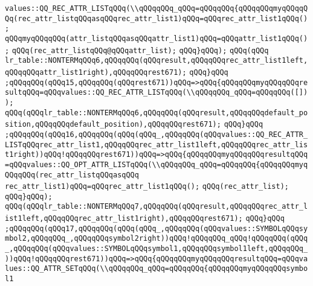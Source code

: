 \verb|values::QQ_REC_ATTR_LISTqQQq(\\qQQqqQQq_qQQq=qQQqqQQq{qQQqqQQqmyqQQqqQQq(rec_attr_listqQQqasqQQqrec_attr_list1)qQQq=qQQqrec_attr_list1qQQq();|\newline
\verb|qQQqmyqQQqqQQq(attr_listqQQqasqQQqattr_list1)qQQq=qQQqattr_list1qQQq();|\newline
\verb|qQQq(rec_attr_listqQQq@qQQqattr_list);|\newline
\verb|qQQq}qQQq);|\newline
\verb|qQQq(qQQq|\newline
\verb|lr_table::NONTERMqQQq6,qQQqqQQq(qQQqresult,qQQqqQQqrec_attr_list1left,qQQqqQQqattr_list1right),qQQqqQQqrest671);|\newline
\verb|qQQq}qQQq|\newline
\verb|;qQQqqQQq(qQQq15,qQQqqQQq(qQQqrest671))qQQq=>qQQq{qQQqqQQqmyqQQqqQQqresultqQQq=qQQqvalues::QQ_REC_ATTR_LISTqQQq(\\qQQqqQQq_qQQq=qQQqqQQq([]));|\newline
\verb|qQQq(qQQqlr_table::NONTERMqQQq6,qQQqqQQq(qQQqresult,qQQqqQQqdefault_position,qQQqqQQqdefault_position),qQQqqQQqrest671);|\newline
\verb|qQQq}qQQq|\newline
\verb|;qQQqqQQq(qQQq16,qQQqqQQq(qQQq(qQQq_,qQQqqQQq(qQQqvalues::QQ_REC_ATTR_LISTqQQqrec_attr_list1,qQQqqQQqrec_attr_list1left,qQQqqQQqrec_attr_list1right))qQQq!qQQqqQQqrest671))qQQq=>qQQq{qQQqqQQqmyqQQqqQQqresultqQQq=qQQqvalues::QQ_OPT_ATTR_LISTqQQq(\\qQQqqQQq_qQQq=qQQqqQQq{qQQqqQQqmyqQQqqQQq(rec_attr_listqQQqasqQQq|\newline
\verb|rec_attr_list1)qQQq=qQQqrec_attr_list1qQQq();|\newline
\verb|qQQq(rec_attr_list);|\newline
\verb|qQQq}qQQq);|\newline
\verb|qQQq(qQQqlr_table::NONTERMqQQq7,qQQqqQQq(qQQqresult,qQQqqQQqrec_attr_list1left,qQQqqQQqrec_attr_list1right),qQQqqQQqrest671);|\newline
\verb|qQQq}qQQq|\newline
\verb|;qQQqqQQq(qQQq17,qQQqqQQq(qQQq(qQQq_,qQQqqQQq(qQQqvalues::SYMBOLqQQqsymbol2,qQQqqQQq_,qQQqqQQqsymbol2right))qQQq!qQQqqQQq_qQQq!qQQqqQQq(qQQq_,qQQqqQQq(qQQqvalues::SYMBOLqQQqsymbol1,qQQqqQQqsymbol1left,qQQqqQQq_))qQQq!qQQqqQQqrest671))qQQq=>qQQq{qQQqqQQqmyqQQqqQQqresultqQQq=qQQqvalues::QQ_ATTR_SETqQQq(\\qQQqqQQq_qQQq=qQQqqQQq{qQQqqQQqmyqQQqqQQqsymbol1|\newline
